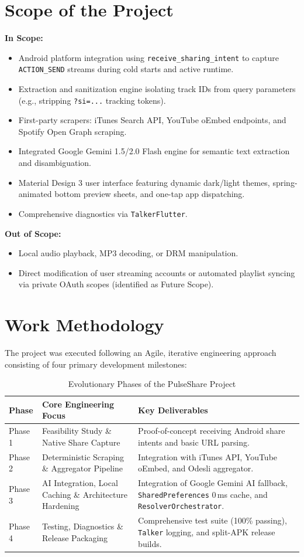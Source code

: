 \documentclass[12pt,a4paper]{report}
\begin{document}
\section{Scope of the Project}
\noindent \textbf{In Scope:}
\begin{itemize}
    \item Android platform integration using \texttt{receive\_sharing\_intent} to capture \texttt{ACTION\_SEND} streams during cold starts and active runtime.
    \item Extraction and sanitization engine isolating track IDs from query parameters (e.g., stripping \texttt{?si=...} tracking tokens).
    \item First-party scrapers: iTunes Search API, YouTube oEmbed endpoints, and Spotify Open Graph scraping.
    \item Integrated Google Gemini 1.5/2.0 Flash engine for semantic text extraction and disambiguation.
    \item Material Design 3 user interface featuring dynamic dark/light themes, spring-animated bottom preview sheets, and one-tap app dispatching.
    \item Comprehensive diagnostics via \texttt{TalkerFlutter}.
\end{itemize}

\noindent \textbf{Out of Scope:}
\begin{itemize}
    \item Local audio playback, MP3 decoding, or DRM manipulation.
    \item Direct modification of user streaming accounts or automated playlist syncing via private OAuth scopes (identified as Future Scope).
\end{itemize}

\section{Work Methodology}
The project was executed following an Agile, iterative engineering approach consisting of four primary development milestones:
\begin{table}[H]
\centering
\caption{Evolutionary Phases of the PulseShare Project}
\label{tab:phases}
\begin{tabularx}{\textwidth}{lXX}
\toprule
\textbf{Phase} & \textbf{Core Engineering Focus} & \textbf{Key Deliverables} \\
\midrule
Phase 1 & Feasibility Study \& Native Share Capture & Proof-of-concept receiving Android share intents and basic URL parsing. \\
Phase 2 & Deterministic Scraping \& Aggregator Pipeline & Integration with iTunes API, YouTube oEmbed, and Odesli aggregator. \\
Phase 3 & AI Integration, Local Caching \& Architecture Hardening & Integration of Google Gemini AI fallback, \texttt{SharedPreferences} 0\,ms cache, and \texttt{ResolverOrchestrator}. \\
Phase 4 & Testing, Diagnostics \& Release Packaging & Comprehensive test suite (100\% passing), \texttt{Talker} logging, and split-APK release builds. \\
\bottomrule
\end{tabularx}
\end{table}
\end{document}

